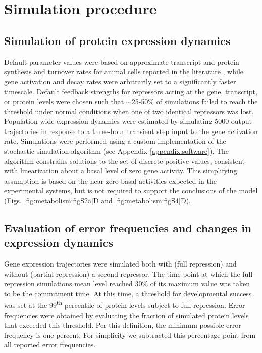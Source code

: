 \section{Simulation procedure}

\subsection{Simulation of protein expression dynamics}
\label{metabolism:methods:simulation}

Default parameter values were based on approximate transcript and protein synthesis and turnover rates for animal cells reported in the literature \cite{Milo2016}, while gene activation and decay rates were arbitrarily set to a significantly faster timescale. Default feedback strengths for repressors acting at the gene, transcript, or protein levels were chosen such that $\sim$25-50\% of simulations failed to reach the threshold under normal conditions when one of two identical repressors was lost. Population-wide expression dynamics were estimated by simulating 5000 output trajectories in response to a three-hour transient step input to the gene activation rate. Simulations were performed using a custom implementation of the stochastic simulation algorithm \cite{Gillespie1977} (see Appendix \ref{appendix:software}). The algorithm constrains solutions to the set of discrete positive values, consistent with linearization about a basal level of zero gene activity. This simplifying assumption is based on the near-zero basal activities expected in the experimental systems, but is not required to support the conclusions of the model (Figs. \ref{fig:metabolism:figS2a}D and \ref{fig:metabolism:figS4}D).

\subsection{Evaluation of error frequencies and changes in expression dynamics}
\label{metabolism:methods:overexpression}

Gene expression trajectories were simulated both with (full repression) and without (partial repression) a second repressor. The time point at which the full-repression simulations mean level reached 30\% of its maximum value was taken to be the commitment time. At this time, a threshold for developmental success was set at the 99\textsuperscript{th} percentile of protein levels subject to full-repression. Error frequencies were obtained by evaluating the fraction of simulated protein levels that exceeded this threshold. Per this definition, the minimum possible error frequency is one percent. For simplicity we subtracted this percentage point from all reported error frequencies.

